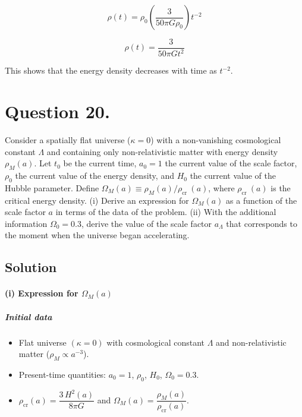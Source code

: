 \documentclass{article}
\begin{document}
\begin{equation}
\rho(t) = \rho_0 \left(\frac{3}{50\pi G \rho_0}\right) t^{-2}
\end{equation}

\begin{equation}
\rho(t) = \frac{3}{50\pi G t^2}
\end{equation}

This shows that the energy density decreases with time as $t^{-2}$.


\pagebreak

\section*{Question 20.} Consider a spatially flat universe ($\kappa=0$) with a non-vanishing cosmological constant $\Lambda$ and containing only non-relativistic matter with energy density $\rho_{M}(a)$. Let $t_{0}$ be the current time, $a_{0}=1$ the current value of the scale factor, $\rho_{0}$ the current value of the energy density, and $H_{0}$ the current value of the Hubble parameter. Define $\Omega_{M}(a) \equiv \rho_{M}(a) / \rho_{\text {cr }}(a)$, where $\rho_{\text {cr }}(a)$ is the critical energy density. (i) Derive an expression for $\Omega_{M}(a)$ as a function of the scale factor $a$ in terms of the data of the problem. (ii) With the additional information $\Omega_{0}=0.3$, derive the value of the scale factor $a_{\Lambda}$ that corresponds to the moment when the universe began accelerating.

\bigskip

\subsection*{Solution}

\paragraph{(i) Expression for \(\Omega_M(a)\)}

\subparagraph{Initial data}
\begin{itemize}
  \item Flat universe \((\kappa = 0)\) with cosmological constant \(\Lambda\) and non-relativistic matter (\(\rho_M \propto a^{-3}\)).
  \item Present-time quantities: \(a_0 = 1\), \(\rho_0\), \(H_0\), \(\Omega_0 = 0.3\).
  \item \(\rho_{\text{cr}}(a) = \dfrac{3\,H^2(a)}{8\pi G}\) and \(\Omega_M(a) = \dfrac{\rho_M(a)}{\rho_{\text{cr}}(a)}.\)
\end{itemize}
\end{document}
